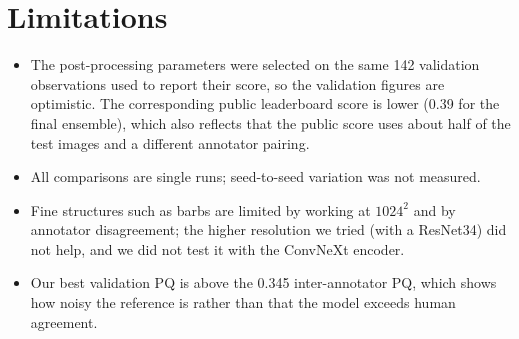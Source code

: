 \documentclass[10pt]{article}
\begin{document}
\section{Limitations}\label{sec:limits}
\begin{itemize}\itemsep0pt
\item The post-processing parameters were selected on the same 142 validation observations used to report their
score, so the validation figures are optimistic. The corresponding public leaderboard score is lower (0.39 for the final
ensemble), which also reflects that the public score uses about half of the test images and a different annotator
pairing.
\item All comparisons are single runs; seed-to-seed variation was not measured.
\item Fine structures such as barbs are limited by working at $1024^2$ and by annotator disagreement; the higher
resolution we tried (with a ResNet34) did not help, and we did not test it with the ConvNeXt encoder.
\item Our best validation PQ is above the 0.345 inter-annotator PQ, which shows how noisy the reference is rather than
that the model exceeds human agreement.
\end{itemize}
\end{document}
